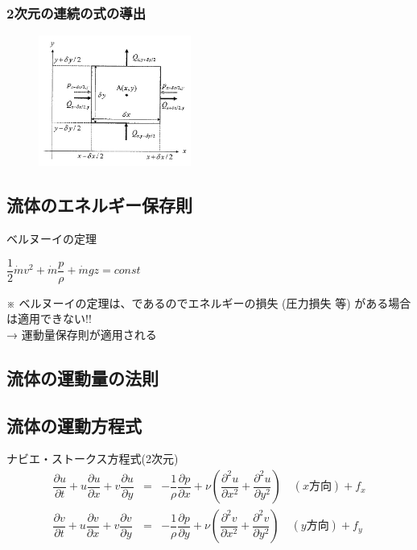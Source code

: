 \documentclass[a4paper]{jsarticle}
\begin{document}
\subsubsection{2次元の連続の式の導出}
\begin{figure}[htbp]
    \begin{center}
        \includegraphics[width=50mm]{images/continuity_equation.jpg}
    \end{center}
\end{figure}
\subsection{流体のエネルギー保存則}
\begin{itembox}[l]{ベルヌーイの定理}
    \begin{center}
        $\dfrac{1}{2}\dot{m}v^2+\dot{m}\dfrac{p}{\rho}+\dot{m}gz=const$
    \end{center}
\end{itembox}
※ ベルヌーイの定理は、であるのでエネルギーの損失 (圧力損失 等) がある場合は適用できない!!\\
→ 運動量保存則が適用される
\subsection{流体の運動量の法則}
\subsection{流体の運動方程式}
\begin{itembox}[l]{ナビエ・ストークス方程式(2次元)}
    \begin{eqnarray*}
        \dfrac{\partial u}{\partial t}+u\dfrac{\partial u}{\partial x}+v\dfrac{\partial u}{\partial y}&=&-\dfrac{1}{\rho}\dfrac{\partial p}{\partial x}+\nu\left(\dfrac{\partial^2 u}{\partial x^2}+\dfrac{\partial^2 u}{\partial y^2}\right)\quad(x方向)+f_x\\
        \dfrac{\partial v}{\partial t}+u\dfrac{\partial v}{\partial x}+v\dfrac{\partial v}{\partial y}&=&-\dfrac{1}{\rho}\dfrac{\partial p}{\partial y}+\nu\left(\dfrac{\partial^2 v}{\partial x^2}+\dfrac{\partial^2 v}{\partial y^2}\right)\quad(y方向)+f_y
    \end{eqnarray*}
\end{itembox}
\end{document}

